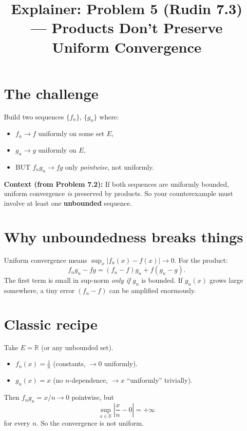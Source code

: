 \documentclass[12pt]{article}
\title{Explainer: Problem 5 (Rudin 7.3) --- Products Don't Preserve Uniform Convergence}
\author{}
\date{}
\begin{document}
\maketitle

\section*{The challenge}
Build two sequences $\{f_n\}$, $\{g_n\}$ where:
\begin{itemize}
  \item $f_n \to f$ uniformly on some set $E$,
  \item $g_n \to g$ uniformly on $E$,
  \item BUT $f_n g_n \to fg$ only \emph{pointwise}, not uniformly.
\end{itemize}

\textbf{Context (from Problem 7.2):} If both sequences are uniformly bounded, uniform convergence \emph{is} preserved by products. So your counterexample must involve at least one \textbf{unbounded} sequence.

\section*{Why unboundedness breaks things}
Uniform convergence means $\sup_x |f_n(x) - f(x)| \to 0$. For the product:
$$
f_n g_n - fg = (f_n - f) g_n + f(g_n - g).
$$
The first term is small in sup-norm \emph{only if} $g_n$ is bounded. If $g_n(x)$ grows large somewhere, a tiny error $(f_n - f)$ can be amplified enormously.

\section*{Classic recipe}
Take $E = \mathbb{R}$ (or any unbounded set).
\begin{itemize}
  \item $f_n(x) = \frac{1}{n}$ (constants, $\to 0$ uniformly).
  \item $g_n(x) = x$ (no $n$-dependence, $\to x$ ``uniformly'' trivially).
\end{itemize}
Then $f_n g_n = x/n \to 0$ pointwise, but
$$
\sup_{x \in \mathbb{R}} \left| \frac{x}{n} - 0 \right| = +\infty
$$
for every $n$. So the convergence is not uniform.

\begin{center}
\end{center}
\end{document}
